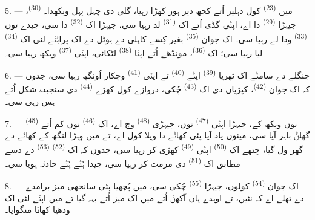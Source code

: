 5. --- میں  \textsuperscript{(23)} کول دہلیز اُتے کجھ دیر ہور
کھڑا رہیا، گلی دی چہل پہل ویکھدا۔  \textsuperscript{(30)}، جیہڑا
 \textsuperscript{(29)} دا اے، اپݨی گڈی اُتے اک 
\textsuperscript{(31)} لد رہیا سی، جیہڑا اک  \textsuperscript{(32)} دا
سی، جیدے توں  \textsuperscript{(33)} ودا لے رہیا سی۔ اک جوان
 \textsuperscript{(35)} بغیر کِسے کاہلی دے ہوٹل دے اک پراہُݨے
لئی اک  \textsuperscript{(34)} لیا رہیا سی؛ اک 
\textsuperscript{(36)}، مونڈھے اُتے اپݨا  \textsuperscript{(38)} لٹکائی،
اپݨی  \textsuperscript{(37)} ویکھ رہیا سی۔

\VUsaut{4.0mm}
\VUsaut{3.0mm}

6. --- جنگلے دے سامݨے اک ٹھریا  \textsuperscript{(39)} اپݨے
 \textsuperscript{(40)} تے اپݨی 
\textsuperscript{(41)} وچکار اُونگھ رہیا سی، جدوں کہ اک جوان 
\textsuperscript{(42)}، کپڑیاں دی اک  \textsuperscript{(43)} چُکی، دروازے
کول کھڑے  \textsuperscript{(44)} دی سنجیدہ شکل اُتے ہس رہی سی۔

7. ---  \textsuperscript{(45)} نوں ویکھ کے، جیہڑا اپݨی
 \textsuperscript{(47)} توں، جیہڑی  \textsuperscript{(48)}
وچ اے، اک  \textsuperscript{(46)} نوں کم اُتے گھلݨ باہر آیا
سی، مینوں یاد آیا پئی کھاݨے دا ویلا کول اے، تے میں وِہڑا لنگھ کے کھاݨے دے گھر ول
گیا، جِتھے اک  \textsuperscript{(50)} اپݨی 
\textsuperscript{(49)} کھڑی کر رہیا سی، جدوں کہ اک  \textsuperscript{(52)}
 \textsuperscript{(53)} دے دسے مطابق اک 
\textsuperscript{(51)} دی مرمت کر رہیا سی، جیدا ہُݨے ہُݨے حادثہ ہویا سی۔

8. --- اک جوان  \textsuperscript{(54)} کولوں، جیہڑا  \textsuperscript{(55)} چُکی سی، میں پُچھیا پئی سانجھی میز برامدے دے تھلے اے کہ
نئیں، تے اوہدے ہاں آکھݨ اُتے میں اک میز اُتے بہہ گیا تے میں اپݨے لئی اک ودھیا کھاݨا
منگوایا۔


\VUsaut{4.0mm}
\VUsaut{3.0mm}


